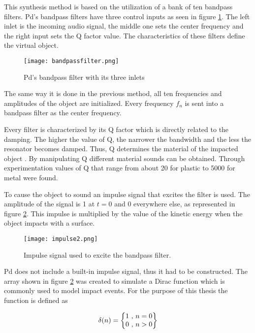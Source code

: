This synthesis method is based on the utilization of a bank of ten bandpass filters. \gls{Pd}'s bandpass filters have three control inputs as seen in figure \ref{fig:pdbandpass}. The left inlet is the incoming audio signal, the middle one sets the center frequency and the right input sets the \gls{Q} factor value. The characteristics of these filters define the virtual object.

\begin{figure}[H]
  \centering
    \texttt{[image: bandpassfilter.png]}
      \caption{Pd's bandpass filter with its three inlets}
      \label{fig:pdbandpass}
\end{figure} 

The same way it is done in the previous method, all ten frequencies and amplitudes of the object are initialized. Every frequency $f_n$ is sent into a bandpass filter as the center frequency. 

Every filter is characterized by its \gls{Q} factor which is directly related to the damping. The higher the value of \gls{Q}, the narrower the bandwidth and the less the resonator becomes damped. Thus, \gls{Q} determines the material of the impacted object \cite{gaver1993we}. By manipulating \gls{Q} different material sounds can be obtained. Through experimentation values of \gls{Q} that range from about 20 for plastic to 5000 for metal were found. 

To cause the object to sound an impulse signal that excites the filter is used. The amplitude of the signal is 1 at $t=0$ and 0 everywhere else, as represented in figure \ref{fig:impulse}. This impulse is multiplied by the value of the kinetic energy when the object impacts with a surface. 

\begin{figure}[H]
  \centering
    \texttt{[image: impulse2.png]}
      \caption{Impulse signal used to excite the bandpass filter.}
      \label{fig:impulse}
\end{figure} 

\gls{Pd} does not include a built-in impulse signal, thus it had to be constructed. The array shown in figure \ref{fig:impulse} was created to simulate a Dirac function which is commonly used to model impact events. For the purpose of this thesis the function is defined as

\begin{equation}\label{eq:dirac}
\delta (n) =  \begin{Bmatrix}
1$ , $n = 0
\\ 
0$ , $n > 0
\end{Bmatrix}
\end{equation}


